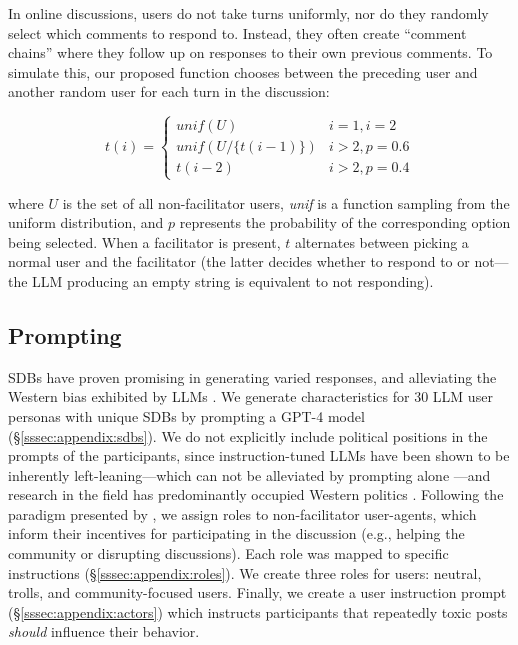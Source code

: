 In online discussions, users do not take turns uniformly, nor do they randomly select which comments to respond to. Instead, they often create ``comment chains'' where they follow up on responses to their own previous comments. To simulate this, our proposed function chooses between the preceding user and another random user for each turn in the discussion:

\small
\begin{equation}
\label{eq:turn_taking}
    t(i) = \left\{
\begin{array}{ll}
    \textit{unif}(U) & i=1, i=2\\
    \textit{unif}(U/\{t(i-1)\}) & i > 2, p=0.6 \\
    t(i-2) & i > 2, p=0.4 
\end{array} 
\right.
\end{equation}
\normalsize

\noindent where $U$ is the set of all non-facilitator users, \textit{unif} is a function sampling from the uniform distribution, and $p$ represents the probability of the corresponding option being selected. When a facilitator is present, $t$ alternates between picking a normal user and the facilitator (the latter decides whether to respond to or not---the \ac{LLM} producing an empty string is equivalent to not responding).


\subsection{Prompting}
\label{ssec:experimental:prompts}

\acfp{SDB} have proven promising in generating varied responses, and alleviating the Western bias exhibited by \acp{LLM} \cite{burton2024large}. We generate characteristics for 30 \ac{LLM} user personas with unique \acp{SDB} by prompting a GPT-4 model \cite{openai2024gpt4technicalreport} (\S\ref{sssec:appendix:sdbs}). We do not explicitly include political positions in the prompts of the participants, since instruction-tuned \acp{LLM} have been shown to be inherently left-leaning---which can not be alleviated by prompting alone \cite{Taubenfeld2024SystematicBI}---and research in the field has predominantly occupied Western politics \cite{Taubenfeld2024SystematicBI, potter-etal-2024-hidden, political_2024, pit2024oninvestigatingpoliticalstance}. 
Following the paradigm presented by \citet{abdelnabi_negotiations}, we assign roles to non-facilitator user-agents, which inform their incentives for participating in the discussion (e.g., helping the community or disrupting discussions). Each role was mapped to specific instructions (\S\ref{sssec:appendix:roles}). We create three roles for users: neutral, trolls, and community-focused users.                                      
 Finally, we create a user instruction prompt (\S\ref{sssec:appendix:actors}) which instructs participants that repeatedly toxic posts \emph{should} influence their behavior. 